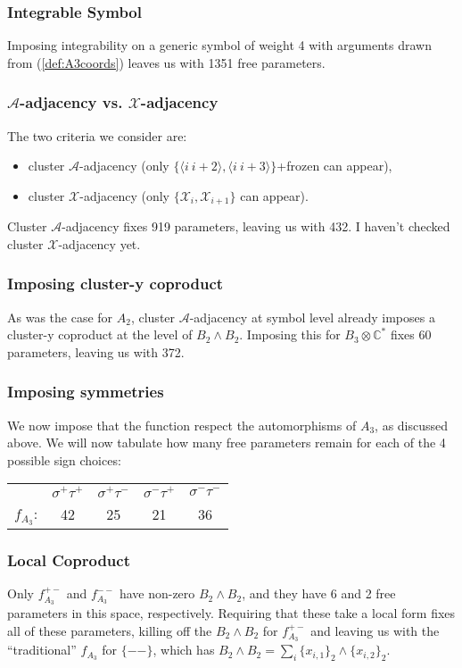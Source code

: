\documentclass[12pt]{article}
\def\ket#1{\langle #1 \rangle}
\def\x{\mathcal{X}}
\def\a{\mathcal{A}}
\begin{document}
\subsubsection*{Integrable Symbol}		
Imposing integrability on a generic symbol of weight 4 with arguments drawn from (\ref{def:A3coords}) leaves us with 1351 free parameters. 

\subsubsection*{$\a$-adjacency vs. $\x$-adjacency}
The two criteria we consider are:
\begin{itemize}
	\item cluster $\a$-adjacency (only $\{\ket{i~i+2},\ket{i~i+3}\}$+frozen can appear),
	\item cluster $\x$-adjacency (only $\{\x_i,\x_{i+1}\}$ can appear).
\end{itemize}
Cluster $\a$-adjacency fixes 919 parameters, leaving us with 432. I haven't checked cluster $\x$-adjacency yet. 

\subsubsection*{Imposing cluster-y coproduct}
As was the case for $A_2$, cluster $\a$-adjacency at symbol level already imposes a cluster-y coproduct at the level of $B_2\wedge B_2$. Imposing this for $B_3 \otimes \mathbb{C}^*$ fixes 60 parameters, leaving us with 372.

\subsubsection*{Imposing symmetries}

We now impose that the function respect the automorphisms of $A_3$, as discussed above. We will now tabulate how many free parameters remain for each of the 4 possible sign choices:
\begin{center}
\begin{tabular}{ rcccc }
\multicolumn{1}{r}{}
 & \multicolumn{1}{c}{$\sigma^+\tau^+$}
 & \multicolumn{1}{c}{$\sigma^+\tau^-$}
 & \multicolumn{1}{c}{$\sigma^-\tau^+$}
 & \multicolumn{1}{c}{$\sigma^-\tau^-$} \\
\cline{2-5}
$f_{A_3}$: & 42 & 25 & 21 & 36 \\
\end{tabular}
\end{center}

\subsubsection*{Local Coproduct}
Only $f_{A_3}^{+-}$ and $f_{A_3}^{--}$ have non-zero $B_2\wedge B_2$, and they have 6 and 2 free parameters in this space, respectively. Requiring that these take a local form fixes all of these parameters, killing off the $B_2\wedge B_2$ for $f_{A_3}^{+-}$ and leaving us with the ``traditional'' $f_{A_3}$ for $\{--\}$, which has $B_2\wedge B_2 = \sum_i\{x_{i,1}\}_2 \wedge \{x_{i,2}\}_2$. 
\end{document}
